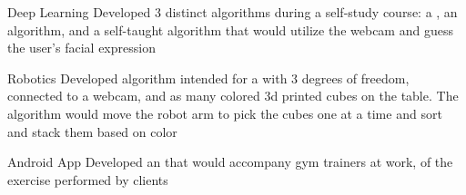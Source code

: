 

\begin{cvskills}

\cvskill
  {Deep Learning} %
  {Developed 3 distinct  algorithms during a self-study course: a , an  algorithm, and a self-taught  algorithm that would utilize the webcam and guess the user's facial expression} %

\cvskill
  {Robotics} %
  {Developed algorithm intended for a  with 3 degrees of freedom, connected to a webcam, and as many colored 3d printed cubes on the table. The algorithm would move the robot arm to pick the cubes one at a time and sort and stack them based on color} %

\cvskill
  {Android App} %
  {Developed an  that would accompany gym trainers at work,  of the exercise performed by clients} %

\end{cvskills}

